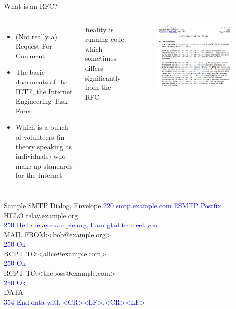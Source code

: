 \documentclass[nobackground,dvipsnames,table,aspectratio=169]{beamer}
\begin{document}
\begin{frame}{What is an RFC?}
    \begin{columns}
            \begin{itemize}
                \item (Not really a) Request For Comment
                \item The basic documents of the IETF, the Internet Engineering Task Force
                \item Which is a bunch of volunteers (in theory speaking as individuals) who make up standards for the Internet
            \end{itemize}
            Reality is running code, which sometimes differs significantly from the RFC
            \begin{figure}
                \centering
                \includegraphics[width=\textwidth]{SMTP}
            \end{figure}
    \end{columns}
\end{frame}

\begin{frame}{Sample SMTP Dialog, Envelope}
    \textcolor{blue}{220 smtp.example.com ESMTP Postfix\\}
    HELO relay.example.org\\
    \textcolor{blue}{250 Hello relay.example.org, I am glad to meet you\\}
    MAIL FROM:<bob@example.org>\\
    \textcolor{blue}{250 Ok\\}
    RCPT TO:<alice@example.com>\\
    \textcolor{blue}{250 Ok\\}
    RCPT TO:<theboss@example.com>\\
    \textcolor{blue}{250 Ok\\}
    DATA\\
    \textcolor{blue}{354 End data with <CR><LF>.<CR><LF>}
\end{frame}
\end{document}
